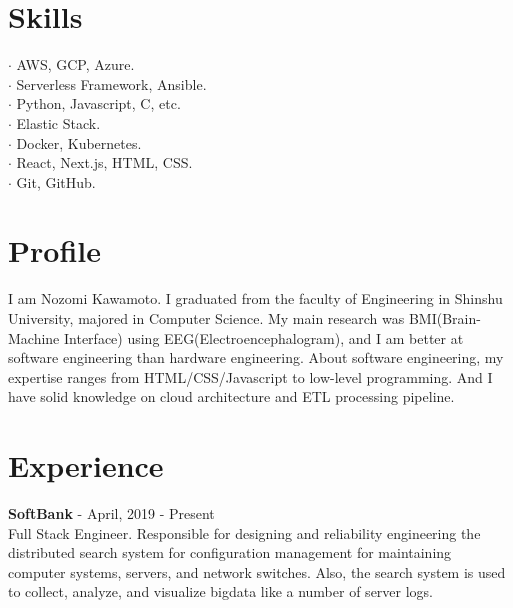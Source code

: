 \documentclass[11pt]{article} %
\begin{document}
\begin{paracol}{2}

\section{\Large Skills}
$\cdot$ AWS, GCP, Azure.\\
$\cdot$ Serverless Framework, Ansible.\\
$\cdot$ Python, Javascript, C, etc.\\
$\cdot$ Elastic Stack.\\
$\cdot$ Docker, Kubernetes.\\
$\cdot$ React, Next.js, HTML, CSS.\\
$\cdot$ Git, GitHub.\\

\switchcolumn %


\section{Profile}
I am Nozomi Kawamoto. I graduated from the faculty of Engineering in Shinshu University, majored in Computer Science. 
My main research was BMI(Brain-Machine Interface) using EEG(Electroencephalogram), and I am better at software engineering than hardware engineering.
About software engineering, my expertise ranges from HTML/CSS/Javascript to low-level programming. And I have solid knowledge on cloud architecture and ETL processing pipeline. 

\vspace{0.5cm}


\section{Experience}
\textbf{\color{subtitle}SoftBank} \hspace{0.5mm} {\color{subtitle} - April, 2019 - Present}\\
Full Stack Engineer. Responsible for designing and reliability engineering the distributed search system 
for configuration management for maintaining computer systems, servers, and network switches. 
Also, the search system is used to collect, analyze, and visualize bigdata like a number of server logs.\\


\end{paracol}
\end{document}
